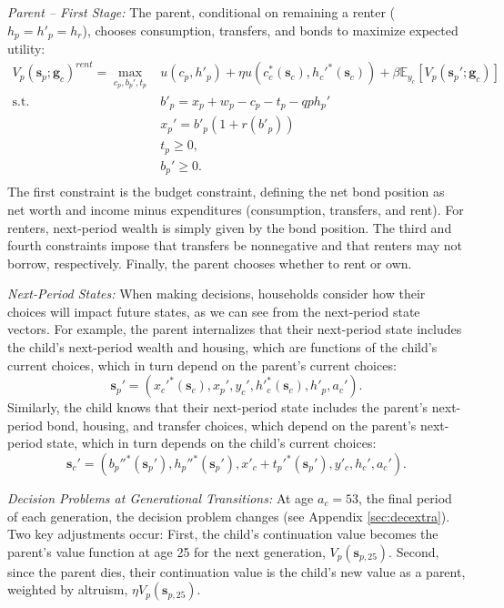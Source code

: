 \documentclass[12pt]{article}
\newcommand{\E}{\mathbb{E}}
\begin{document}
\textit{Parent -- First Stage:} The parent, conditional on remaining a renter ($h_p=h'_p=h_r$), chooses consumption, transfers, and bonds to maximize expected utility:
\begin{equation}\label{eq:Vp}
\begin{split}
V_p(\mathbf{s}_p;\mathbf{g}_c)^{rent} = \max_{c_p,b_p',t_p} & u(c_p,h'_p) + {\eta} u\left(c_c^*({\mathbf{s}_c}),h_c'^*({\mathbf{s}_c})\right) + \beta \E_{y_c} \left[V_{p}(\mathbf{s}_p';\mathbf{g}_c)\right] \\
\text{s.t.}\quad & b'_p = x_p + w_p - c_p - t_p - q p h_p'\\
& x_p' = b'_p(1+r(b'_p)) \\
& t_p\ge0, \\
& b_p'\ge 0. \\
\end{split}
\end{equation}
The first constraint is the budget constraint, defining the net bond position as net worth and income minus expenditures (consumption, transfers, and rent). For renters, next-period wealth is simply given by the bond position. The third and fourth constraints impose that transfers be nonnegative and that renters may not borrow, respectively. Finally, the parent chooses whether to rent or own.

\textit{Next-Period States:}
When making decisions, households consider how their choices will impact future states, as we can see from the next-period state vectors. For example, the parent internalizes that their next-period state includes the child's next-period wealth and housing, which are functions of the child's current choices, which in turn depend on the parent's current choices:
\begin{equation}
	\mathbf{s}_p' = \left(x_c'^{*}({\mathbf{s}_c}),x_p',y_c',h'^*_c({\mathbf{s}_c}),h'_p,a_c'\right).
\end{equation}
Similarly, the child knows that their next-period state includes the parent's next-period bond, housing, and transfer choices, which depend on the parent's next-period state, which in turn depends on the child's current choices:
\begin{equation}
	\mathbf{s}_c' = (b_p''^*({\mathbf{s}_p'}),h_p''^*({\mathbf{s}_p'}),x'_c + t_p'^*({\mathbf{s}_p'}),y'_c,h_c',a_c').
\end{equation}


\textit{Decision Problems at Generational Transitions:}
At age $a_c=53$, the final period of each generation, the decision problem changes (see Appendix \ref{sec:decextra}). Two key adjustments occur: First, the child's continuation value becomes the parent's value function at age 25 for the next generation, $V_p(\mathbf{s}_{p,25})$. Second, since the parent dies, their continuation value is the child's new value as a parent, weighted by altruism, $\eta V_p(\mathbf{s}_{p,25})$.
\end{document}
